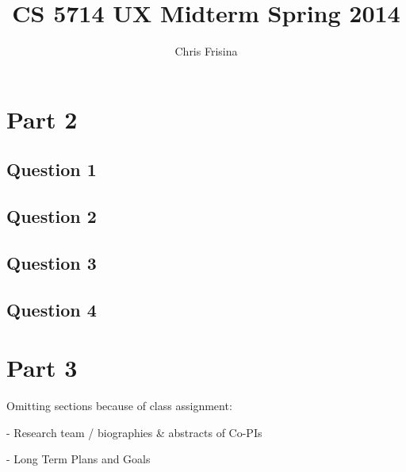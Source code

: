 \documentclass[11pt]{article}
\begin{document}
\title{CS 5714 UX Midterm Spring 2014}
\author{Chris Frisina}

\section*{Part 2} %
  \subsection{Question 1}

  \subsection{Question 2}

  \subsection{Question 3}
  
  \subsection{Question 4}

\section*{Part 3} %

\newpage



Omitting sections because of class assignment:

 - Research team / biographies \& abstracts of Co-PIs

 - Long Term Plans and Goals
\end{document}
